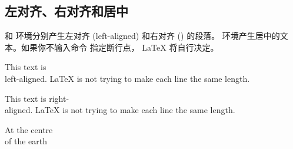 \subsection{左对齐、右对齐和居中}
 和  环境分别产生左对齐 (left-aligned) 和右对齐 () 的段落。 环境产生居中的文本。如果你不输入命令 \ci{\bs} 指定断行点，
  \LaTeX{} 将自行决定。

\begin{example}
\begin{flushleft}
This text is\\ left-aligned.
\LaTeX{} is not trying to make
each line the same length.
\end{flushleft}
\end{example}

\begin{example}
\begin{flushright}
This text is right-\\aligned.
\LaTeX{} is not trying to make
each line the same length.
\end{flushright}
\end{example}

\begin{example}
\begin{center}
At the centre\\of the earth
\end{center}
\end{example}

